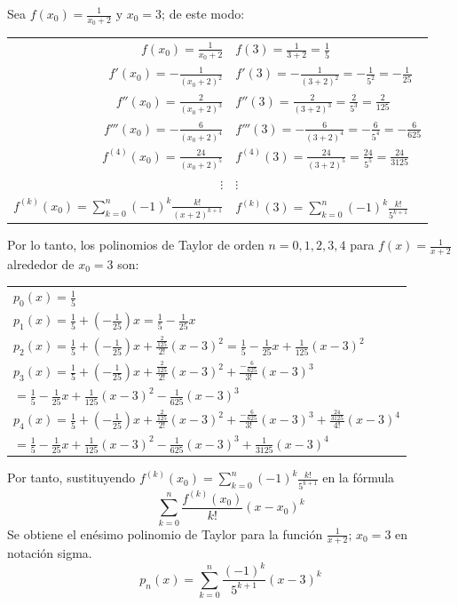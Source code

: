 \documentclass[12pt]{article}
\begin{document}
Sea $f(x_0)=\frac{1}{x_0+2}$ y $x_0=3$; de este modo:
\begin{center}
  \begin{tabular}{r l}
    $f(x_0)=\frac{1}{x_0+2}$ & $f(3)=\frac{1}{3+2}=\frac{1}{5}$\\
    $f'(x_0)=-\frac{1}{(x_0+2)^2}$ & $f'(3)=-\frac{1}{(3+2)^2}=-\frac{1}{5^2}=-\frac{1}{25}$\\
    $f''(x_0)=\frac{2}{(x_0+2)^3}$ & $f''(3)=\frac{2}{(3+2)^3}=\frac{2}{5^3}=\frac{2}{125}$\\
    $f'''(x_0)=-\frac{6}{(x_0+2)^4}$ & $f'''(3)=-\frac{6}{(3+2)^4}=-\frac{6}{5^4}=-\frac{6}{625}$ \\
    $f^{(4)}(x_0)=\frac{24}{(x_0+2)^5}$ & $f^{(4)}(3)=\frac{24}{(3+2)^5}=\frac{24}{5^5}=\frac{24}{3125}$ \\
    $\vdots$ & $\vdots$ \\
    $f^{(k)}(x_0)=\sum_{k=0}^{n} (-1)^k \frac{k!}{(x+2)^{k+1}}$ & $f^{(k)}(3)=\sum_{k=0}^{n} (-1)^k \frac{k!}{5^{k+1}}$ \\
  \end{tabular}
\end{center}
Por lo tanto, los polinomios de Taylor de orden $n = 0, 1, 2, 3, 4$ para $f(x)=\frac{1}{x+2}$ alrededor de $x_0 = 3$ son:
\begin{center}
  \begin{tabular}{l}
    $p_0(x)=\frac{1}{5}$ \\
    $p_1(x)=\frac{1}{5}+(-\frac{1}{25})x=\frac{1}{5}-\frac{1}{25}x$ \\
    $p_2(x)=\frac{1}{5}+(-\frac{1}{25})x+\frac{\frac{2}{125}}{2!}(x-3)^2=\frac{1}{5}-\frac{1}{25}x+\frac{1}{125}(x-3)^2$ \\
    $p_3(x)=\frac{1}{5}+(-\frac{1}{25})x+\frac{\frac{2}{125}}{2!}(x-3)^2+\frac{-\frac{6}{625}}{3!}(x-3)^3$ \\
    $=\frac{1}{5}-\frac{1}{25}x+\frac{1}{125}(x-3)^2-\frac{1}{625}(x-3)^3$ \\
    $p_4(x)=\frac{1}{5}+(-\frac{1}{25})x+\frac{\frac{2}{125}}{2!}(x-3)^2+\frac{-\frac{6}{625}}{3!}(x-3)^3+\frac{\frac{24}{3125}}{4!}(x-3)^4$ \\
    $=\frac{1}{5}-\frac{1}{25}x+\frac{1}{125}(x-3)^2-\frac{1}{625}(x-3)^3+\frac{1}{3125}(x-3)^4$ \\
  \end{tabular}
\end{center}
Por tanto, sustituyendo $f^{(k)}(x_0)=\sum_{k=0}^{n} (-1)^k \frac{k!}{5^{k+1}}$ en la fórmula
\[ \sum_{k=0}^{n} \frac{f^{(k)}(x_0)}{k!}(x-x_0)^k \]
Se obtiene el enésimo polinomio de Taylor para la función $\frac{1}{x+2} \text{; } x_0=3$ en notación sigma.
\[
p_n(x)=\sum_{k=0}^{n} \frac{(-1)^k}{5^{k+1}}(x-3)^k
\]
\end{document}
